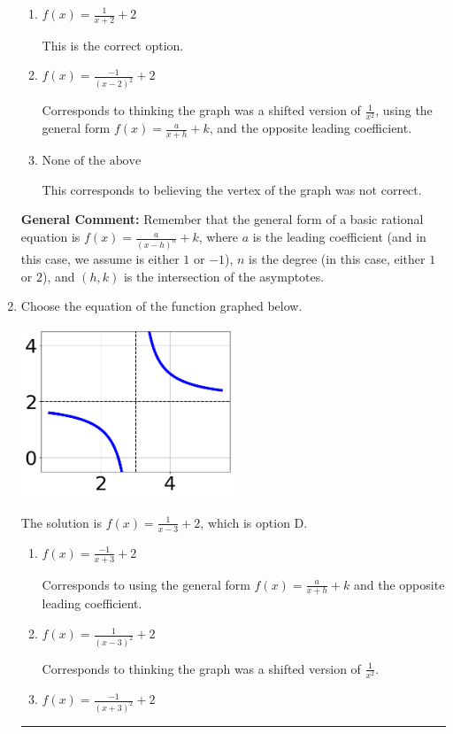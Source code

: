 \documentclass{extbook}[14pt]
\newcommand{\litem}[1]{\item #1

\rule{\textwidth}{0.4pt}}
\begin{document}
\begin{enumerate}
{\begin{enumerate}[label=\Alph*.]
Corresponds to thinking the graph was a shifted version of $\frac{1}{x^2}$.
\item \( f(x) = \frac{1}{x + 2} + 2 \)

This is the correct option.
\item \( f(x) = \frac{-1}{(x - 2)^2} + 2 \)

Corresponds to thinking the graph was a shifted version of $\frac{1}{x^2}$, using the general form $f(x) = \frac{a}{x+h}+k$, and the opposite leading coefficient.
\item \( \text{None of the above} \)

This corresponds to believing the vertex of the graph was not correct.
\end{enumerate}

\textbf{General Comment:} Remember that the general form of a basic rational equation is $ f(x) = \frac{a}{(x-h)^n} + k$, where $a$ is the leading coefficient (and in this case, we assume is either $1$ or $-1$), $n$ is the degree (in this case, either $1$ or $2$), and $(h, k)$ is the intersection of the asymptotes.
}
\litem{
Choose the equation of the function graphed below.

\begin{center}
    \includegraphics[width=0.5\textwidth]{../Figures/rationalGraphToEquationCopyA.png}
\end{center}


The solution is \( f(x) = \frac{1}{x - 3} + 2 \), which is option D.\begin{enumerate}[label=\Alph*.]
\item \( f(x) = \frac{-1}{x + 3} + 2 \)

Corresponds to using the general form $f(x) = \frac{a}{x+h}+k$ and the opposite leading coefficient.
\item \( f(x) = \frac{1}{(x - 3)^2} + 2 \)

Corresponds to thinking the graph was a shifted version of $\frac{1}{x^2}$.
\item \( f(x) = \frac{-1}{(x + 3)^2} + 2 \)


\end{enumerate}}
\end{enumerate}
\end{document}
